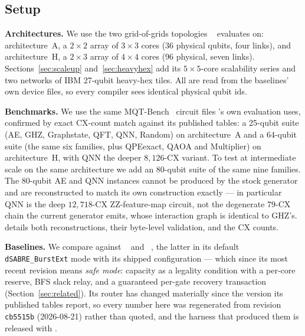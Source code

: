 \subsection{Setup}
\label{sec:setup}

\textbf{Architectures.} We use the two grid-of-grids topologies
\dSABRE{}~\cite{lidsabre} evaluates on: architecture~A, a $2{\times}2$
array of $3{\times}3$ cores (36 physical qubits, four links), and
architecture~H, a $2{\times}3$ array of $4{\times}4$ cores (96
physical, seven links). Sections~\ref{sec:scaleup}
and~\ref{sec:heavyhex} add its $5{\times}5$-core scalability series and
two networks of IBM 27-qubit heavy-hex tiles. All are read from the
baselines' own device files, so every compiler sees identical physical
qubit ids.

\textbf{Benchmarks.} We use the same MQT-Bench~\cite{quetschlich2023mqtbench}
circuit files \dSABRE{}'s own evaluation uses, confirmed by exact
CX-count match against its published tables: a 25-qubit suite (AE, GHZ,
Graphstate, QFT, QNN, Random) on architecture~A and a 64-qubit suite
(the same six families, plus QPEexact, QAOA and Multiplier) on
architecture~H, with QNN the deeper $8{,}126$-CX variant. To test at
intermediate scale on the same architecture we add an 80-qubit suite of
the same nine families. The 80-qubit AE and QNN instances cannot be
produced by the stock generator and are reconstructed to match its own
construction exactly --- in particular QNN is the deep $12{,}718$-CX
ZZ-feature-map circuit, not the degenerate 79-CX chain the current
generator emits, whose interaction graph is identical to GHZ's.
\appSuite{} details both reconstructions, their byte-level validation,
and the CX counts.

\textbf{Baselines.} We compare against
\TeleSABRE{}~\cite{russo2025telesabre} and \dSABRE{}~\cite{lidsabre},
the latter in its default \texttt{dSABRE\_BurstExt} mode with its
shipped configuration --- which since its most recent revision means
\emph{safe mode}: capacity as a legality condition with a per-core
reserve, BFS slack relay, and a guaranteed per-gate recovery
transaction (Section~\ref{sec:related}). Its router has changed
materially since the version its published tables report, so every
\dSABRE{} number here was regenerated from revision \texttt{cb5515b}
(2026-08-21) rather than quoted, and the harness that produced them is
released with \PORTER{}.

